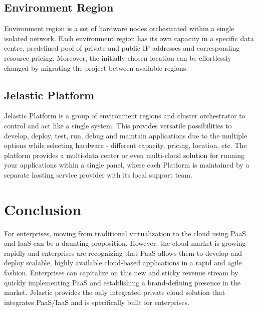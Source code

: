\documentclass[9pt,twocolumn,twoside]{../../styles/osajnl}
\begin{document}
\subsection{Environment Region}
Environment region is a set of hardware nodes orchestrated within a single
isolated network. Each environment region has its own capacity in a specific
data centre, predefined pool of private and public IP addresses and \cite{paper-jelastic2}
corresponding resource pricing. Moreover, the initially chosen location can be
effortlessly changed by migrating the project between available regions.\cite{www-jelastic4}


\subsection{Jelastic Platform}
Jelastic Platform is a group of environment regions and cluster orchestrator to
control and act like a single system. This provides versatile possibilities to
develop, deploy, test, run, debug and maintain applications due to the multiple
options while selecting hardware - different capacity, pricing, location, etc.
The platform provides a multi-data center or even multi-cloud solution for
running your applications within a single panel, where each Platform is
maintained by a separate hosting service provider with its local support team.\cite{www-jelastic1}

\section{Conclusion}
For enterprises, moving from traditional virtualization to the cloud using PaaS
and IaaS can be a daunting proposition. However, the cloud market is growing 
rapidly and enterprises are recognizing that PaaS allows them to develop and 
deploy scalable, highly available cloud-based applications in a rapid and agile 
fashion. Enterprises can capitalize on this new and sticky revenue stream by 
quickly implementing PaaS and establishing a brand-defining presence in the 
market. Jelastic provides the only integrated private cloud solution that 
integrates PaaS/IaaS and is specifically built for enterprises.\cite{www-jelastic6}



\end{document}
